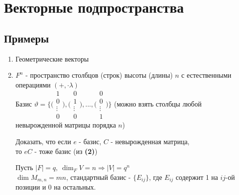 \section{Векторные подпространства}
  \subsection{Примеры}
  \begin{enumerate}
    \item Геометрические векторы
    \item $F^n$ - пространство столбцов (строк) высоты (длины) $n$ с естественными операциями $(+, \cdot \lambda)$ \vspace{0.4cm}\\
    Базис $\vartheta  = \bigg\{ \Biggl( \begin{smallmatrix}
      1 \\ 0 \\ \vdots \\ 0
    \end{smallmatrix}\Biggr), \Biggl(\begin{smallmatrix}
      0 \\ 1 \\ \vdots \\ 0
    \end{smallmatrix}\Biggr), ... , \Biggl(\begin{smallmatrix}
      0 \\ 0 \\ \vdots \\ 1
    \end{smallmatrix}\Biggr) \bigg\}$ (можно взять столбцы любой\vspace{0.3cm}\\ невырожденной матрицы порядка $n$)
    \begin{remark}
      Доказать, что если $e$ - базис, $C$ - невырожденная матрица,\\ то $eC$ - тоже базис (из \textbf{(2)})
    \end{remark} 
    \begin{exercise}
      Пусть $|F| = q, \ \dim_F V = n \Longrightarrow |V| = q^n$\\
      $\dim M_{m,n} = mn$, стандартный базис - $\{E_{ij}\}$, где $E_{ij}$ содержит 1 на $ij$-ой позиции и $0$ на остальных.  

\end{exercise}
\end{enumerate}
